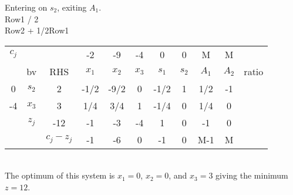 \documentclass[answers]{exam}
\begin{document}
\noindent
Entering on $s_2$, exiting $A_1$. \\
Row1 / 2 \\
Row2 + 1/2Row1 \\


\begin{tabular}{ccccccccccc}
	$c_j$                   &                            &                                & -2    & -9    & -4    & 0     & 0     & M    & M    &       \\
	\multicolumn{1}{c|}{}   & \multicolumn{1}{c|}{bv}    & \multicolumn{1}{c|}{RHS}       & $x_1$ & $x_2$ & $x_3$ & $s_1$ & $s_2$ & $A_1$ & $A_2$ & ratio \\ \cline{1-10}
	\multicolumn{1}{c|}{0}  & \multicolumn{1}{c|}{$s_2$} & \multicolumn{1}{c|}{2}         & -1/2  & -9/2  & 0     & -1/2  & 1     & 1/2   & -1    &       \\
	\multicolumn{1}{c|}{-4} & \multicolumn{1}{c|}{$x_3$} & \multicolumn{1}{c|}{3}         & 1/4   & 3/4   & 1     & -1/4  & 0     & 1/4   & 0     &       \\ \cline{1-10}
	& \multicolumn{1}{c|}{$z_j$} & \multicolumn{1}{c|}{-12}       & -1    & -3    & -4    & 1     & 0     & -1    & 0     &       \\ \cline{3-10}
	&                            & \multicolumn{1}{c|}{$c_j-z_j$} & -1    & -6    & 0     & -1    & 0     & M-1  & M    &      
\end{tabular} \\

\noindent
The optimum of this system is $x_1 = 0$, $x_2 = 0$, and $x_3 = 3$ giving the minimum $z = 12$.
\end{document}
